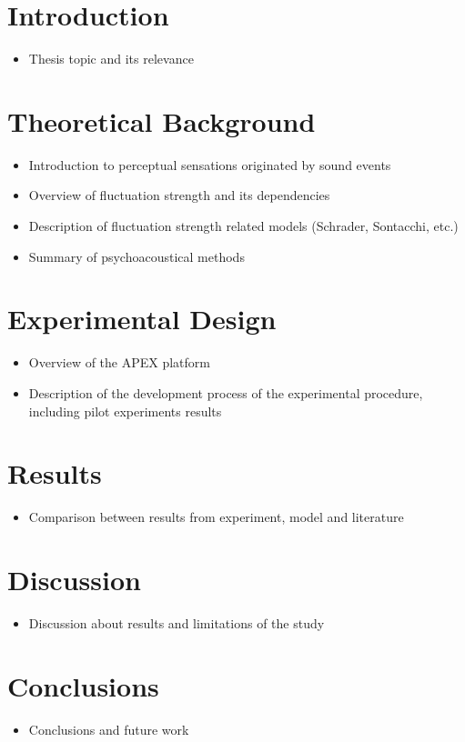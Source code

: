 \documentclass{article}
\begin{document}

\section{Introduction}
\begin{itemize}
  \item Thesis topic and its relevance
\end{itemize}

\section{Theoretical Background}
\begin{itemize}
  \item Introduction to perceptual sensations originated by sound events
  \item Overview of fluctuation strength and its dependencies
  \item Description of fluctuation strength related models (Schrader,
    Sontacchi, etc.)
  \item Summary of psychoacoustical methods
\end{itemize}

\section{Experimental Design}
\begin{itemize}
  \item Overview of the APEX platform
  \item Description of the development process of the experimental procedure,
    including pilot experiments results
\end{itemize}

\section{Results}
\begin{itemize}
  \item Comparison between results from experiment, model and literature
\end{itemize}

\section{Discussion}
\begin{itemize}
  \item Discussion about results and limitations of the study
\end{itemize}

\section{Conclusions}
\begin{itemize}
  \item Conclusions and future work
\end{itemize}
\end{document}
